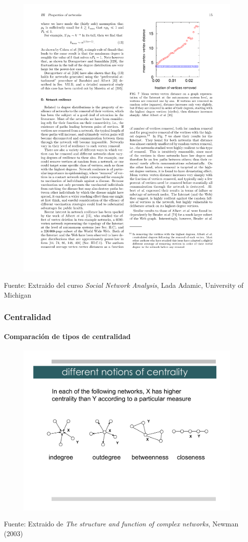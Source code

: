 \documentclass[10pt,draft]{beamer}
\begin{document}
\begin{frame}
\begin{figure}
\includegraphics[trim=11cm 16cm 1.5cm 1.5cm, clip=true, width=.6\linewidth]{newman_network_resilense.pdf}
\end{figure}
{\footnotesize Fuente: Extraido del curso \emph{Social Network Analysis}, Lada
Adamic, University of Michigan \cite{lada2014}}
\end{frame}

\begin{frame}
\frametitle{Centralidad}
\framesubtitle{Comparaci\'on de tipos de centralidad}
\begin{figure}
\includegraphics[trim=2cm 6cm 2cm 4cm, clip=true, width=\linewidth]{Lecture3Acentrality_comparison.pdf}
\end{figure}
{\footnotesize Fuente: Extraido de \emph{The structure and function of complex networks}, Newman (2003) \cite{newman2003structure}}
\end{frame}
\end{document}

